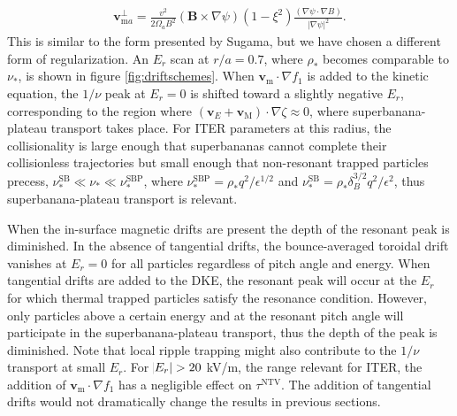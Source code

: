 \documentclass[aip, pop, preprint]{revtex4-1}
\numberwithin{figure}{section}
\numberwithin{equation}{section}
\begin{document}
\begin{gather}
\bm{v}_{\text{m}a}^{\perp} = \frac{v^2}{2\Omega_aB^2} (\bm{B} \times \nabla \psi) (1 - \xi^2) \frac{(\nabla \psi \cdot \nabla B)}{\rvert \nabla \psi \rvert^2}.
\label{eq:mds5}
\end{gather}
This is similar to the form presented by Sugama,\cite{Sugama2016} but we have chosen a different form of regularization. An $E_r$ scan at $r/a = 0.7$, where $\rho_*$ becomes comparable to $\nu_*$, is shown in figure \ref{fig:driftschemes}. When $\bm{v}_{\text{m}} \cdot \nabla f_1$ is added to the kinetic equation, the $1/\nu$ peak at $E_r = 0$ is shifted toward a slightly negative $E_r$, corresponding to the region where $(\bm{v}_E + \bm{v}_\text{M})\cdot \nabla \zeta \approx 0$, where superbanana-plateau transport takes place. For ITER parameters at this radius, the collisionality is large enough that superbananas cannot complete their collisionless trajectories but small enough that non-resonant trapped particles precess, $\nu_*^{\text{SB}} \ll \nu_* \ll \nu_*^{\text{SBP}}$, where $\nu_*^{\text{SBP}} = \rho_*q^2/\epsilon^{1/2}$ and $\nu_*^{\text{SB}} = \rho_* \delta_B^{3/2} q^2/\epsilon^2$,\cite{Shaing2009_sb, Shaing2009_sbp} thus superbanana-plateau transport is relevant.

When the in-surface magnetic drifts are present the depth of the resonant peak is diminished. In the absence of tangential drifts, the bounce-averaged toroidal drift vanishes at $E_r = 0$ for all particles regardless of pitch angle and energy. When tangential drifts are added to the DKE, the resonant peak will occur at the $E_r$ for which thermal trapped particles satisfy the resonance condition. However, only particles above a certain energy and at the resonant pitch angle will participate in the superbanana-plateau transport, thus the depth of the peak is diminished. Note that local ripple trapping might also contribute to the $1/\nu$ transport at small $E_r$. For $\abs{E_r} > 20$ kV/m, the range relevant for ITER, the addition of $\bm{v}_{\text{m}}\cdot \nabla f_1$ has a negligible effect on $\tau^{\text{NTV}}$. The addition of tangential drifts would not dramatically change the results in previous sections.  
\end{document}
